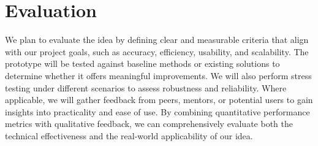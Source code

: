 \section{Evaluation}
\label{sec:evaluation}

We plan to evaluate the idea by defining clear and measurable criteria that align with our project goals, such as 
accuracy, efficiency, usability, and scalability. The prototype will be tested against baseline methods or existing solutions to determine whether it 
offers meaningful improvements. We will also perform stress testing under different scenarios to assess robustness and reliability. Where applicable, we 
will gather feedback from peers, mentors, or potential users to gain insights into practicality and ease of use. By combining 
quantitative performance metrics with qualitative feedback, we can comprehensively evaluate both the technical effectiveness and the real-world 
applicability of our idea.
